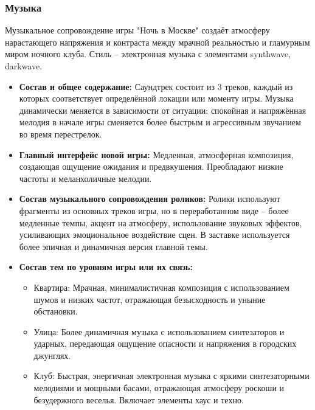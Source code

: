 \documentclass[12pt]{article}
\begin{document}
        \subsubsection{Музыка}
        Музыкальное сопровождение игры "Ночь в Москве"  создаёт атмосферу нарастающего напряжения и контраста между мрачной реальностью и гламурным миром ночного клуба.  Стиль – электронная музыка с элементами  synthwave, darkwave.
    \begin{itemize}
        \item \textbf {Состав и общее содержание:} Саундтрек состоит из 3 треков, каждый из которых  соответствует определённой локации или моменту игры. Музыка динамически меняется в зависимости от ситуации: спокойная и напряжённая мелодия в начале игры сменяется  более быстрым и агрессивным звучанием во время перестрелок.
    \end{itemize}
    \begin{itemize}
        \item \textbf {Главный интерфейс новой игры:}  Медленная, атмосферная композиция, создающая ощущение ожидания и предвкушения.  Преобладают низкие частоты и меланхоличные мелодии.
    \end{itemize}
    \begin{itemize}
        \item \textbf {Состав музыкального сопровождения роликов:}  Ролики используют фрагменты из основных треков игры, но в переработанном виде –  более медленные темпы, акцент на атмосферу,  использование звуковых эффектов, усиливающих эмоциональное воздействие сцен.  В заставке используется  более эпичная и динамичная версия главной темы.
    \end{itemize}
    \begin{itemize}
        \item \textbf {Состав тем по уровням игры или их связь:}
        \begin{itemize}
            \item Квартира:  Мрачная, минималистичная композиция с использованием  шумов и низких частот, отражающая безысходность и уныние обстановки.
            
            \item Улица:  Более динамичная музыка с использованием синтезаторов и ударных, передающая ощущение опасности и напряжения в городских джунглях.
     
            \item Клуб:  Быстрая, энергичная электронная музыка с яркими синтезаторными мелодиями и мощными басами, отражающая атмосферу роскоши и безудержного веселья.  Включает элементы хаус и техно.
        \end{itemize}
    \end{itemize}
\end{document}
